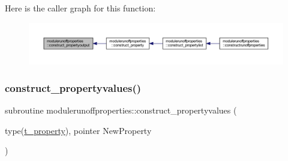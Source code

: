 Here is the caller graph for this function\+:\nopagebreak
\begin{figure}[H]
\begin{center}
\leavevmode
\includegraphics[width=350pt]{namespacemodulerunoffproperties_aaad69eea7f005151f91a94b3105aed34_icgraph}
\end{center}
\end{figure}
\mbox{\label{namespacemodulerunoffproperties_a72bab581ca5f460f8d99af192c79b0ed}} 
\subsubsection{\texorpdfstring{construct\+\_\+propertyvalues()}{construct\_propertyvalues()}}
{\footnotesize\ttfamily subroutine modulerunoffproperties\+::construct\+\_\+propertyvalues (\begin{DoxyParamCaption}\item[{type(\mbox{\hyperlink{structmodulerunoffproperties_1_1t__property}{t\+\_\+property}}), pointer}]{New\+Property }\end{DoxyParamCaption})\hspace{0.3cm}{\ttfamily [private]}}

